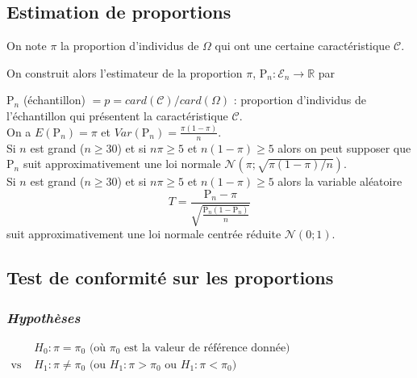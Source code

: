 \documentclass[12pt, a4paper]{article}
\begin{document}
\subsection{Estimation de proportions}\label{EstimationProportion}

On note $\pi$ la proportion d'individus de $\Omega$ qui ont une certaine caractéristique $\mathcal{C}$.

On construit alors l'estimateur de la proportion $\pi$, $\mathrm{P}_n : \mathcal{E}_n \longrightarrow \mathbb{R}$ par

$\mathrm{P}_n$ (échantillon) $=p = card(\mathcal{C}) / card(\Omega)$ : proportion d'individus de l'échantillon qui présentent la 
caractéristique $\mathcal{C} $.\\

 On a  $E(\mathrm{P}_n)=\pi$ et 
$Var(\mathrm{P}_n)=\frac{\pi(1-\pi)}{n}$.\\

 Si $n$ est grand ($n\geq 30$) et si $n\pi\geq 5$ et $n(1-\pi)\geq 5$ alors on peut 
supposer
que $\mathrm{P}_n$ suit approximativement une loi normale $\mathcal{N}(\pi;\sqrt{\pi(1-\pi)/n})$.\\

 Si $n$ est grand ($n\geq 30$) et si $n\pi\geq 5$ et $n(1-\pi)\geq 5$ alors la variable aléatoire
$$
T=\frac{\mathrm{P}_n - \pi}{\sqrt{\frac{\mathrm{P}_n (1-\mathrm{P}_n)}{n}}}
$$ 
suit approximativement une loi normale centrée réduite $\mathcal{N}(0;1)$.

\subsection{Test de conformité sur les proportions}



\subsubsection*{\it Hypothèses}
\begin{center}
$
\begin{array}{ll}
& H_0: \pi = \pi_0 \mbox{ (où } \pi_0 \mbox{ est la valeur de référence donnée)} \\
\mbox{vs } & H_1: \pi \neq \pi_0  \mbox{ (ou } H_1: \pi > \pi_0 \mbox{ ou } H_1: \pi < \pi_0)
\end{array}
$
\end{center}
\end{document}
